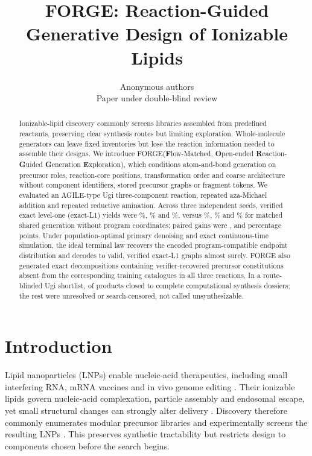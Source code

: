 \documentclass{article}
\title{FORGE: Reaction-Guided Generative Design of Ionizable Lipids}
\author{Anonymous authors\\Paper under double-blind review}
\begin{document}
\maketitle

\begin{abstract}
Ionizable-lipid discovery commonly screens libraries assembled from predefined reactants, preserving
clear synthesis routes but limiting exploration. Whole-molecule generators can leave fixed
inventories but lose the reaction information needed to assemble their designs. We introduce
FORGE(\textbf{F}low-Matched, \textbf{O}pen-ended \textbf{R}eaction-\textbf{G}uided \textbf{G}eneration \textbf{E}xploration), which conditions atom-and-bond generation on precursor roles,
reaction-core positions, transformation order and coarse architecture without component identifiers,
stored precursor graphs or fragment tokens. We evaluated an AGILE-type Ugi three-component reaction,
repeated aza-Michael addition and repeated reductive amination. Across three independent seeds,
verified exact level-one (exact-L1) yields were
\ForgeTableOneConditionedUgiYield\%, \ForgeTableOneConditionedBLYield\% and
\ForgeTableOneConditionedLXYield\%, versus \ForgeTableOneNullUgiYield\%,
\ForgeTableOneNullBLYield\% and \ForgeTableOneNullLXYield\% for matched shared generation without
program coordinates; paired gains were
\ForgeTableOneNullUgiDifferencePP, \ForgeTableOneNullBLDifferencePP{} and
\ForgeTableOneNullLXDifferencePP{} percentage points. Under population-optimal primary denoising and
exact continuous-time simulation, the ideal terminal law recovers the encoded program-compatible
endpoint distribution and decodes to valid, verified exact-L1 graphs almost surely. FORGE also
generated exact decompositions containing verifier-recovered precursor constitutions absent from the
corresponding training catalogues in all three reactions. In a route-blinded Ugi shortlist,
\ForgeRouteCompleteProducts{} of \ForgeRouteAdmitted{} products closed to complete computational
synthesis dossiers; the rest were unresolved or search-censored, not called unsynthesizable.
\end{abstract}

\section{Introduction}

Lipid nanoparticles (LNPs) enable nucleic-acid therapeutics, including small interfering RNA, mRNA
vaccines and in vivo genome editing
\citep{adams2018patisiran,polack2020safety,baden2021efficacy,gillmore2021crispr}. Their ionizable
lipids govern nucleic-acid complexation, particle assembly and endosomal escape, yet small structural
changes can strongly alter delivery \citep{cullis2017lipid,hou2021lipid,han2021ionizable}. Discovery
therefore commonly enumerates modular precursor libraries and experimentally screens the resulting
LNPs \citep{akinc2008combinatorial,love2010lipidlike,li2024accelerating,xu2024agile}. This preserves
synthetic tractability but restricts design to components chosen before the search begins.
\end{document}
